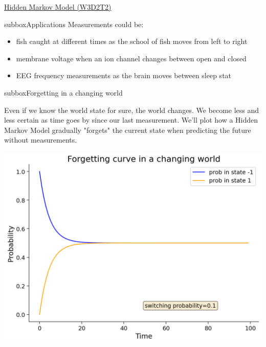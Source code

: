 \begin{textbox}{\href{http://instructor.compneuro.neuromatch.io/tutorials/W3D2_HiddenDynamics/instructor/W3D2_Tutorial2.html}{Hidden Markov Model (W3D2T2)}   }
\begin{subbox}{subbox}{Applications}
Measurements could be:
\begin{itemize}
    \item 
 fish caught at different times as the school of fish moves from left to right
\item membrane voltage when an ion channel changes between open and closed
\item EEG frequency measurements as the brain moves between sleep stat
\end{itemize}

\end{subbox}
\begin{subbox}{subbox}{Forgetting in a changing world}
\scriptsize



Even if we know the world state for sure, the world changes. We become less and less certain as time goes by since our last measurement. We'll plot how a Hidden Markov Model gradually "forgets" the current state when predicting the future without measurements.
\begin{center}
    
\includegraphics[scale=0.2]{Figures/HD/HD_Figure4.png}
\end{center}
\end{subbox}



\end{textbox}
